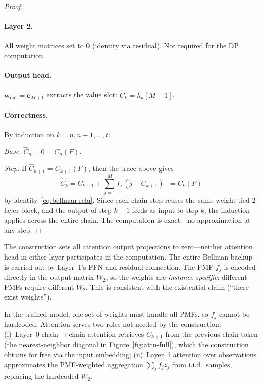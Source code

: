 \begin{proof}
\paragraph{Layer 2.}
All weight matrices set to $\mathbf{0}$ (identity via residual). Not required for the DP computation.

\paragraph{Output head.}
$\mathbf{w}_{\mathrm{out}} = \mathbf{e}_{M+1}$ extracts the value slot: $\hat C_k = h_k[M{+}1]$.

\paragraph{Correctness.}
By induction on $k = n, n{-}1, \ldots, t$:

\emph{Base.} $\hat C_n = 0 = C_n(F)$.

\emph{Step.} If $\hat C_{k+1} = C_{k+1}(F)$, then the trace above gives
\[
\hat C_k = C_{k+1} + \textstyle\sum_{j=1}^{M} f_j\,(j - C_{k+1})^{+} = C_k(F)
\]
by identity~\eqref{eq:bellman-relu}. Since each chain step reuses the same weight-tied 2-layer block, and the output of step $k{+}1$ feeds as input to step $k$, the induction applies across the entire chain. The computation is exact---no approximation at any step. \qedhere
\end{proof}

\begin{remark}
\label{rem:instance-specific}
The construction sets all attention output projections to zero---neither attention head in either layer participates in the computation. The entire Bellman backup is carried out by Layer~1's FFN and residual connection. The PMF $f_j$ is encoded directly in the output matrix $W_2$, so the weights are \emph{instance-specific}: different PMFs require different $W_2$. This is consistent with the existential claim (``there exist weights'').

In the trained model, one set of weights must handle all PMFs, so $f_j$ cannot be hardcoded. Attention serves two roles not needed by the construction: (i)~Layer~0 chain$\to$chain attention retrieves $C_{k+1}$ from the previous chain token (the nearest-neighbor diagonal in Figure~\ref{fig:attn-full}), which the construction obtains for free via the input embedding; (ii)~Layer~1 attention over observations approximates the PMF-weighted aggregation $\sum_j f_j z_j$ from i.i.d.\ samples, replacing the hardcoded $W_2$.
\end{remark}
